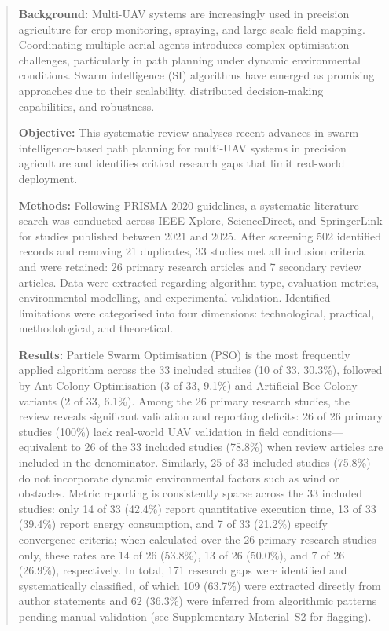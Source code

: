 \documentclass[review,3p,times]{elsarticle}
\begin{document}
\begin{frontmatter}
\begin{abstract}
\textbf{Background:} Multi-UAV systems are increasingly used in precision agriculture
for crop monitoring, spraying, and large-scale field mapping. Coordinating multiple
aerial agents introduces complex optimisation challenges, particularly in path planning
under dynamic environmental conditions. Swarm intelligence (SI) algorithms have
emerged as promising approaches due to their scalability, distributed decision-making
capabilities, and robustness.

\textbf{Objective:} This systematic review analyses recent advances in swarm
intelligence-based path planning for multi-UAV systems in precision agriculture and
identifies critical research gaps that limit real-world deployment.

\textbf{Methods:} Following PRISMA 2020 guidelines, a systematic literature search
was conducted across IEEE Xplore, ScienceDirect, and SpringerLink for studies
published between 2021 and 2025. After screening 502 identified records and removing
21 duplicates, 33 studies met all inclusion criteria and were retained: 26 primary
research articles and 7 secondary review articles. Data were extracted regarding
algorithm type, evaluation metrics, environmental modelling, and experimental
validation. Identified limitations were categorised into four dimensions:
technological, practical, methodological, and theoretical.

\textbf{Results:} Particle Swarm Optimisation (PSO) is the most frequently applied
algorithm across the 33 included studies (10 of 33, 30.3\%), followed by Ant Colony
Optimisation (3 of 33, 9.1\%) and Artificial Bee Colony variants (2 of 33, 6.1\%).
Among the 26 primary research studies, the review reveals significant validation and
reporting deficits: 26 of 26 primary studies (100\%) lack real-world UAV validation
in field conditions---equivalent to 26 of the 33 included studies (78.8\%) when
review articles are included in the denominator. Similarly, 25 of 33 included studies
(75.8\%) do not incorporate dynamic environmental factors such as wind or obstacles.
Metric reporting is consistently sparse across the 33 included studies: only 14 of
33 (42.4\%) report quantitative execution time, 13 of 33 (39.4\%) report energy
consumption, and 7 of 33 (21.2\%) specify convergence criteria; when calculated
over the 26 primary research studies only, these rates are 14 of 26 (53.8\%), 13 of
26 (50.0\%), and 7 of 26 (26.9\%), respectively. In total, 171 research gaps were identified and systematically classified, of which 109 (63.7\%) were extracted directly from author statements and 
62 (36.3\%) were inferred from algorithmic patterns pending manual validation 
(see Supplementary Material~S2 for flagging).


\end{abstract}
\end{frontmatter}
\end{document}

